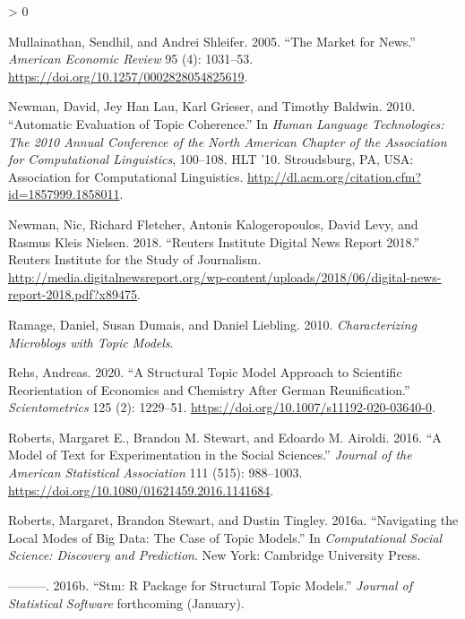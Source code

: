 \documentclass[
  12pt,
]{article}
\newlength{\cslhangindent}
\newenvironment{CSLReferences}[2] %
 {%
  \setlength{\parindent}{0pt}
  \ifodd #1 \everypar{\setlength{\hangindent}{\cslhangindent}}\ignorespaces\fi
  \ifnum #2 > 0
  \setlength{\parskip}{#2\baselineskip}
  \fi
 }%
 {}
\begin{document}
\begin{CSLReferences}{1}{0}
\leavevmode\hypertarget{ref-mullainathan_market_2005}{}%
Mullainathan, Sendhil, and Andrei Shleifer. 2005. {``The Market for
News.''} \emph{American Economic Review} 95 (4): 1031--53.
\url{https://doi.org/10.1257/0002828054825619}.

\leavevmode\hypertarget{ref-newman_automatic_2010}{}%
Newman, David, Jey Han Lau, Karl Grieser, and Timothy Baldwin. 2010.
{``Automatic Evaluation of Topic Coherence.''} In \emph{Human Language
Technologies: The 2010 Annual Conference of the North American Chapter
of the Association for Computational Linguistics}, 100--108. {HLT} '10.
Stroudsburg, {PA}, {USA}: Association for Computational Linguistics.
\url{http://dl.acm.org/citation.cfm?id=1857999.1858011}.

\leavevmode\hypertarget{ref-newman_reuters_2018}{}%
Newman, Nic, Richard Fletcher, Antonis Kalogeropoulos, David Levy, and
Rasmus Kleis Nielsen. 2018. {``Reuters Institute Digital News Report
2018.''} Reuters Institute for the Study of Journalism.
\url{http://media.digitalnewsreport.org/wp-content/uploads/2018/06/digital-news-report-2018.pdf?x89475}.

\leavevmode\hypertarget{ref-ramage_characterizing_2010}{}%
Ramage, Daniel, Susan Dumais, and Daniel Liebling. 2010.
\emph{Characterizing Microblogs with Topic Models}.

\leavevmode\hypertarget{ref-rehs_structural_2020}{}%
Rehs, Andreas. 2020. {``A Structural Topic Model Approach to Scientific
Reorientation of Economics and Chemistry After German Reunification.''}
\emph{Scientometrics} 125 (2): 1229--51.
\url{https://doi.org/10.1007/s11192-020-03640-0}.

\leavevmode\hypertarget{ref-roberts_model_2016}{}%
Roberts, Margaret E., Brandon M. Stewart, and Edoardo M. Airoldi. 2016.
{``A Model of Text for Experimentation in the Social Sciences.''}
\emph{Journal of the American Statistical Association} 111 (515):
988--1003. \url{https://doi.org/10.1080/01621459.2016.1141684}.

\leavevmode\hypertarget{ref-roberts_navigating_2016}{}%
Roberts, Margaret, Brandon Stewart, and Dustin Tingley. 2016a.
{``Navigating the Local Modes of Big Data: The Case of Topic Models.''}
In \emph{Computational Social Science: Discovery and Prediction}. New
York: Cambridge University Press.

\leavevmode\hypertarget{ref-roberts_stm:_2016}{}%
---------. 2016b. {``Stm: R Package for Structural Topic Models.''}
\emph{Journal of Statistical Software} forthcoming (January).


\end{CSLReferences}
\end{document}
